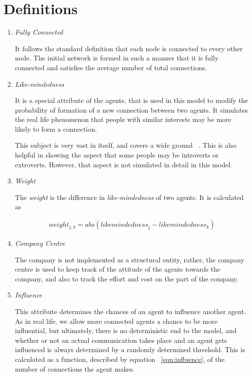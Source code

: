 \section{Definitions}
\label{sec:definitions}
\begin{enumerate}
\item \emph{Fully Connected}

It follows the standard definition that each node is connected to every other node. The initial network is formed in such a manner that it is fully connected and satisfies the average number of total connections.

\item \emph{Like-mindedness}

It is a special attribute of the agents, that is used in this model to modify the probability of formation of a new connection between two agents. It simulates the real life phenomenon that people with similar interests may be more likely to form a connection. 

This subject is very vast in itself, and covers a wide ground ~\cite{jung1921question, Wilt08extraversion}. This is also helpful in showing the aspect that some people may be introverts or extroverts. However, that aspect is not simulated in detail in this model.

\item \emph{Weight}

The \textit{weight} is the difference in \textit{like-mindedness} of two agents. It is calculated as 

\begin{eqnarray}
weight_{j,k} = abs( likemindedness_{j} - likemindedness_{k} )
\label{eqn:weight}
\end{eqnarray}

\item \emph{Company Centre}

The company is not implemented as a structural entity, rather, the company centre is used to keep track of the attitude of the agents towards the company, and also to track the effort and cost on the part of the company.

\item \emph{Influence}

This attribute determines the chances of an agent to influence another agent. As in real life, we allow more connected agents a chance to be more influential, but ultimately, there is no deterministic end to the model, and whether or not an actual communication takes place and an agent gets influenced is always determined by a randomly determined threshold. 
This is calculated as a function, described by equation ~\ref{eqn:influence}, of the number of connections the agent makes.


\end{enumerate}
